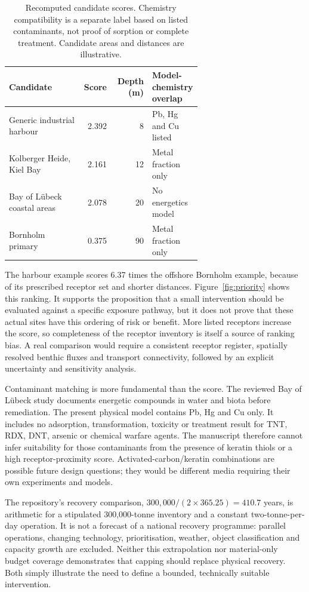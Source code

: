 \begin{table}[htbp]
\centering\small
\caption{Recomputed candidate scores. Chemistry compatibility is a separate label based on listed contaminants, not proof of sorption or complete treatment. Candidate areas and distances are illustrative.}
\label{tab:priority}
\begin{tabular}{p{0.39\linewidth}rrp{0.25\linewidth}}
\toprule
Candidate & Score & Depth (m) & Model-chemistry overlap \\
\midrule
Generic industrial harbour & 2.392 & 8 & Pb, Hg and Cu listed \\
Kolberger Heide, Kiel Bay & 2.161 & 12 & Metal fraction only \\
Bay of L\"ubeck coastal areas & 2.078 & 20 & No energetics model \\
Bornholm primary & 0.375 & 90 & Metal fraction only \\
\bottomrule
\end{tabular}
\end{table}

The harbour example scores 6.37 times the offshore Bornholm example, because of its prescribed receptor set and shorter distances. Figure~\ref{fig:priority} shows this ranking. It supports the proposition that a small intervention should be evaluated against a specific exposure pathway, but it does not prove that these actual sites have this ordering of risk or benefit. More listed receptors increase the score, so completeness of the receptor inventory is itself a source of ranking bias. A real comparison would require a consistent receptor register, spatially resolved benthic fluxes and transport connectivity, followed by an explicit uncertainty and sensitivity analysis.

Contaminant matching is more fundamental than the score. The reviewed Bay of L\"ubeck study documents energetic compounds in water and biota before remediation.\cite{bayLuebeck2025} The present physical model contains Pb, Hg and Cu only. It includes no adsorption, transformation, toxicity or treatment result for TNT, RDX, DNT, arsenic or chemical warfare agents. The manuscript therefore cannot infer suitability for those contaminants from the presence of keratin thiols or a high receptor-proximity score. Activated-carbon/keratin combinations are possible future design questions; they would be different media requiring their own experiments and models.

The repository's recovery comparison, $300{,}000/(2\times365.25)=410.7$ years, is arithmetic for a stipulated 300,000-tonne inventory and a constant two-tonne-per-day operation. It is not a forecast of a national recovery programme: parallel operations, changing technology, prioritisation, weather, object classification and capacity growth are excluded. Neither this extrapolation nor material-only budget coverage demonstrates that capping should replace physical recovery. Both simply illustrate the need to define a bounded, technically suitable intervention.

